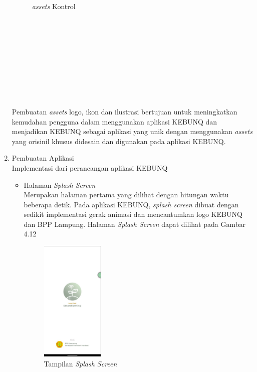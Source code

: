 \begin{flushleft}
\begin{justify}
\begin{enumerate}
\begin{figure}[ht]
                \caption{\textit{assets} Kontrol}
            \end{figure}
            \noindent \\\\\\\\\\\\\\\\\\Pembuatan \emph{assets} logo, ikon dan ilustrasi bertujuan untuk meningkatkan kemudahan pengguna dalam menggunakan aplikasi KEBUNQ dan menjadikan KEBUNQ sebagai aplikasi yang unik dengan menggunakan \emph{assets} yang orisinil khusus didesain dan digunakan pada aplikasi KEBUNQ. \\
            \item Pembuatan Aplikasi\\
            Implementasi dari perancangan aplikasi KEBUNQ
            \begin{itemize}
                \item Halaman \emph{Splash Screen}\\
                Merupakan halaman pertama yang dilihat dengan hitungan waktu beberapa detik. Pada aplikasi KEBUNQ, \emph{splash screen} dibuat dengan sedikit implementasi gerak animasi dan mencantumkan logo KEBUNQ dan BPP Lampung.
                Halaman \emph{Splash Screen} dapat dilihat pada Gambar 4.12
                \begin{figure}[ht]
                    \centering
                    \includegraphics[width=3cm]{images/bab 4/splash.jpeg}
                    \caption{Tampilan \emph{Splash Screen}}
                \end{figure}


\end{itemize}
\end{enumerate}
\end{justify}
\end{flushleft}
